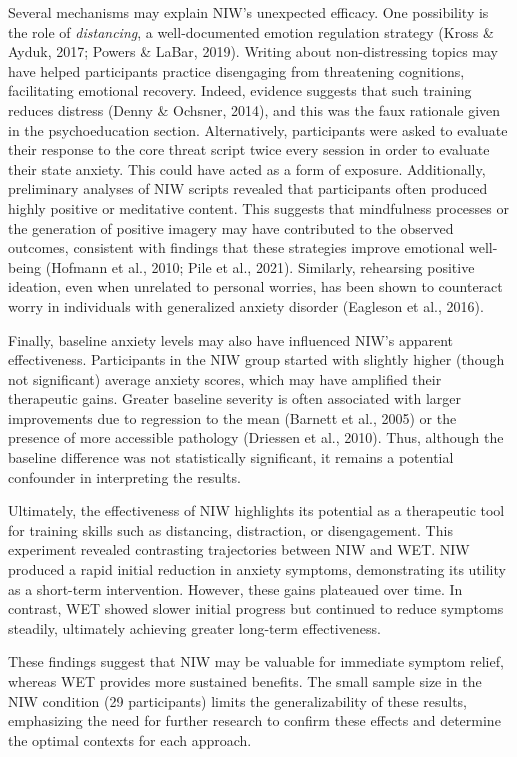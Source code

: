 \documentclass[
  man,floatsintext]{apa7}
\begin{document}
Several mechanisms may explain NIW's unexpected efficacy.
One possibility is the role of \emph{distancing}, a well-documented emotion regulation strategy (Kross \& Ayduk, 2017; Powers \& LaBar, 2019).
Writing about non-distressing topics may have helped participants practice disengaging from threatening cognitions, facilitating emotional recovery.
Indeed, evidence suggests that such training reduces distress (Denny \& Ochsner, 2014), and this was the faux rationale given in the psychoeducation section.
Alternatively, participants were asked to evaluate their response to the core threat script twice every session in order to evaluate their state anxiety.
This could have acted as a form of exposure.
Additionally, preliminary analyses of NIW scripts revealed that participants often produced highly positive or meditative content.
This suggests that mindfulness processes or the generation of positive imagery may have contributed to the observed outcomes, consistent with findings that these strategies improve emotional well-being (Hofmann et al., 2010; Pile et al., 2021).
Similarly, rehearsing positive ideation, even when unrelated to personal worries, has been shown to counteract worry in individuals with generalized anxiety disorder (Eagleson et al., 2016).

Finally, baseline anxiety levels may also have influenced NIW's apparent effectiveness.
Participants in the NIW group started with slightly higher (though not significant) average anxiety scores, which may have amplified their therapeutic gains.
Greater baseline severity is often associated with larger improvements due to regression to the mean (Barnett et al., 2005) or the presence of more accessible pathology (Driessen et al., 2010).
Thus, although the baseline difference was not statistically significant, it remains a potential confounder in interpreting the results.

Ultimately, the effectiveness of NIW highlights its potential as a therapeutic tool for training skills such as distancing, distraction, or disengagement.
This experiment revealed contrasting trajectories between NIW and WET.
NIW produced a rapid initial reduction in anxiety symptoms, demonstrating its utility as a short-term intervention.
However, these gains plateaued over time.
In contrast, WET showed slower initial progress but continued to reduce symptoms steadily, ultimately achieving greater long-term effectiveness.

These findings suggest that NIW may be valuable for immediate symptom relief, whereas WET provides more sustained benefits.
The small sample size in the NIW condition (29 participants) limits the generalizability of these results, emphasizing the need for further research to confirm these effects and determine the optimal contexts for each approach.
\end{document}
